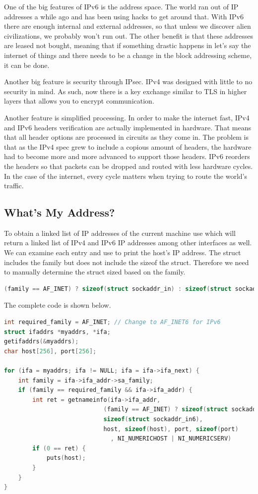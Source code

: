 One of the big features of IPv6 is the address space.
The world ran out of IP addresses a while ago and has been using hacks to get around that.
With IPv6 there are enough internal and external addresses, so that unless we discover alien civilizations, we probably won't run out.
The other benefit is that these addresses are leased not bought, meaning that if something drastic happens in let's say the internet of things and there needs to be a change in the block addressing scheme, it can be done.

Another big feature is security through IPsec.
IPv4 was designed with little to no security in mind.
As such, now there is a key exchange similar to TLS in higher layers that allows you to encrypt communication.

Another feature is simplified processing.
In order to make the internet fast, IPv4 and IPv6 headers verification are actually implemented in hardware.
That means that all header options are processed in circuits as they come in.
The problem is that as the IPv4 spec grew to include a copious amount of headers, the hardware had to become more and more advanced to support those headers.
IPv6 reorders the headers so that packets can be dropped and routed with less hardware cycles.
In the case of the internet, every cycle matters when trying to route the world's traffic.

\subsection{What's My Address?}

To obtain a linked list of IP addresses of the current machine use  which will return a linked list of IPv4 and IPv6 IP addresses among other interfaces as well.
We can examine each entry and use  to print the host's IP address.
The  struct includes the family but does not include the sizeof the struct.
Therefore we need to manually determine the struct sized based on the family.

\begin{lstlisting}[language=C]
 (family == AF_INET) ? sizeof(struct sockaddr_in) : sizeof(struct sockaddr_in6)
\end{lstlisting}

The complete code is shown below.

\begin{lstlisting}[language=C]
int required_family = AF_INET; // Change to AF_INET6 for IPv6
struct ifaddrs *myaddrs, *ifa;
getifaddrs(&myaddrs);
char host[256], port[256];

for (ifa = myaddrs; ifa != NULL; ifa = ifa->ifa_next) {
    int family = ifa->ifa_addr->sa_family;
    if (family == required_family && ifa->ifa_addr) {
        int ret = getnameinfo(ifa->ifa_addr,
                            (family == AF_INET) ? sizeof(struct sockaddr_in) :
                            sizeof(struct sockaddr_in6),
                            host, sizeof(host), port, sizeof(port)
                              , NI_NUMERICHOST | NI_NUMERICSERV)
        if (0 == ret) {
            puts(host);
        }
    }
}
\end{lstlisting}

